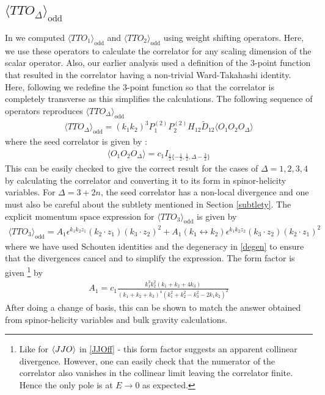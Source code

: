 \documentclass[a4paper,11pt]{article}
\begin{document}
\subsection{$\langle TTO_{\Delta} \rangle_{\text{odd}}$}
In \cite{Jain:2021wyn} we computed $\langle TTO_1 \rangle_{\text{odd}}$ and $\langle TTO_2 \rangle_{\text{odd}}$ using weight shifting operators. Here, we use these operators to calculate the correlator for any scaling dimension of the scalar operator. Also, our earlier analysis used a definition of the $3$-point function that resulted in the correlator having a non-trivial Ward-Takahashi identity. Here, following \cite{Bzowski:2018fql} we redefine the $3$-point function so that the correlator is completely transverse as this simplifies the calculations.
The following sequence of operators reproduces $\langle TTO_{\Delta} \rangle_{\text{odd}}$
\begin{align}
    \langle TTO_{\Delta}\rangle_{\text{odd}} = (k_1 k_2)^3P_1^{(2)}P_2^{(2)}H_{12}\widetilde{D}_{12}\langle O_1 O_2 O_{\Delta} \rangle
\end{align}
where the seed correlator is given by :
\begin{align}
    \langle O_1 O_2 O_{\Delta} \rangle = c_1 I_{\frac{1}{2}\{-\frac{1}{2},\frac{1}{2},\Delta-\frac{3}{2}\}}
\end{align}
This can be easily checked to give the correct result for the cases of $\Delta=1,2,3,4$ by calculating the correlator and converting it to its form in spinor-helicity variables. For $\Delta=3+2n$, the seed correlator has a non-local divergence and one must also be careful about the subtlety mentioned in Section \ref{subtlety}.
The explicit momentum space expression for $\langle TTO_3 \rangle_{\text{odd}}$ is given by
\begin{align}
    \langle TTO_3 \rangle_{\text{odd}} = A_1 \epsilon^{k_1 k_2 z_1}(k_2 \cdot z_1)(k_3 \cdot z_2)^2 +A_1(k_1 \leftrightarrow k_2)\epsilon^{k_1 k_2 z_2}(k_3 \cdot z_2)(k_2 \cdot z_1)^2
\end{align}
where we have used Schouten identities and the degeneracy in \eqref{degen} to ensure that the divergences cancel and to simplify the expression. The form factor is given \footnote{Like for $\ev{JJO}$ in \eqref{JJOff} - this form factor suggests an apparent collinear divergence. However, one can easily check that the numerator of the correlator also vanishes in the collinear limit leaving the correlator finite. Hence the only pole is at $E\rightarrow 0$ as expected.} by
\begin{align}
    A_1 = c_1\frac{k_1^3 k_2^2(k_1+k_2+4k_3)}{(k_1+k_2+k_3)^4(k_1^2+k_2^2-k_3^2-2k_1k_2)^2}
\end{align}
After doing a change of basis, this can be shown to match the answer obtained from spinor-helicity variables and bulk gravity calculations. 
\end{document}
